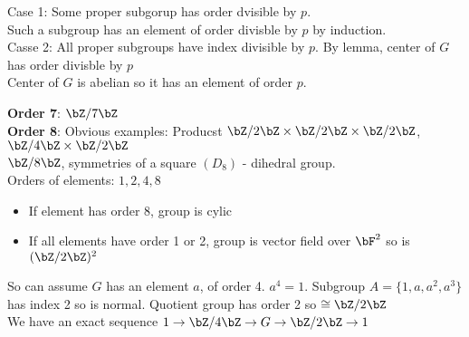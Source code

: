 \begin{pf}
    Case 1: Some proper subgorup has order dvisible by $p$. \\
    Such a subgroup has an element of order divisble by $p$ by induction. \\
    Casse 2: All proper subgroups have index divisible by $p$. By lemma, center of $G$ has order divisble by $p$ \\
    Center of $G$ is abelian so it has an element of order $p$. 
\end{pf} 

\noindent
\textbf{Order 7}: $\bZ/7\bZ$ \\

\noindent
\textbf{Order 8}: Obvious examples: Producst $\bZ/2\bZ \times \bZ/2\bZ \times \bZ/2\bZ$, $\bZ/4\bZ \times \bZ/2\bZ$ \\
$\bZ/8\bZ$, symmetries of a square $(D_8)$ - dihedral group.\\
Orders of elements: $1, 2, 4, 8$ 
\begin{itemize}
    \item If element has order 8, group is cylic 
    \item If all elements have order 1 or 2, group is vector field over $\bF^2$ so is $(\bZ/2\bZ)^2$ 
\end{itemize}
So can assume $G$ has an element $a$, of order 4. $a^4=1$. Subgroup $A = \{1,a, a^2, a^3\}$ has index 2 so is normal. Quotient group has order 2 so $\cong \bZ/2\bZ$ \\
We have an exact sequence $1 \to \bZ/4\bZ \to G \to \bZ/2\bZ \to 1$ \\

